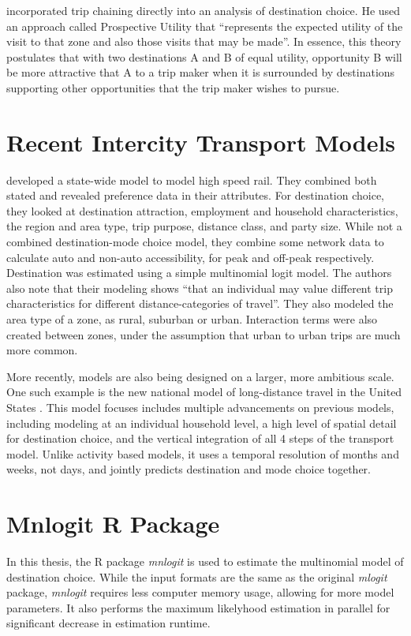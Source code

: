 \textcite{Kitamura84} incorporated trip chaining directly into an analysis of destination choice. He used an approach called Prospective Utility that \enquote{represents the expected utility of the visit to that zone and also those visits that may be made}. In essence, this theory postulates that with two destinations A and B of equal utility, opportunity B will be more attractive that A to a trip maker when it is surrounded by destinations supporting other opportunities that the trip maker wishes to pursue.

\section{Recent Intercity Transport Models}
\autocite{Outwater10} developed a state-wide model to model high speed rail. They combined both stated and revealed preference data in their attributes. For destination choice, they looked at destination attraction, employment and household characteristics, the region and area type, trip purpose, distance class, and party size. While not a combined destination-mode choice model, they combine some network data to calculate auto and non-auto accessibility, for peak and off-peak respectively. Destination was estimated using a simple multinomial logit model. The authors also note that their modeling shows \enquote{that an individual may value different trip characteristics for different distance-categories of travel}. They also modeled the area type of a zone, as rural, suburban or urban. Interaction terms were also created between zones, under the assumption that urban to urban trips are much more common.

More recently, models are also being designed on a larger, more ambitious scale. One such example is the new national model of long-distance travel in the United States \parencite{Outwater15}. This model focuses includes multiple advancements on previous models, including modeling at an individual household level, a high level of spatial detail for destination choice, and the vertical integration of all 4 steps of the transport model. Unlike activity based models, it uses a temporal resolution of months and weeks, not days, and jointly predicts destination and mode choice together. 

\section{Mnlogit R Package}
\label{section:mnlogit-structure}
\label{section:mnlogit}
In this thesis, the R package \textit{mnlogit} \parencite{hasan2014fast} is used to estimate the multinomial model of destination choice. While the input formats are the same as the original \textit{mlogit} package, \textit{mnlogit} requires less computer memory usage, allowing for more model parameters. It also performs the maximum likelyhood estimation in parallel for significant decrease in estimation runtime.
